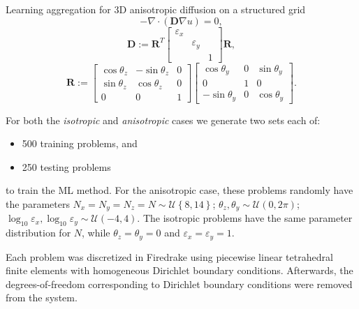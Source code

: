 \documentclass{article}
\newcommand{\mat}[1]{\bm{{#1}}}
\newcommand{\grad}{\nabla}
\begin{document}

Learning aggregation for 3D anisotropic diffusion on a structured grid
\begin{equation}
  -\grad \cdot \left(\mat{D} \grad u\right) = 0,
\end{equation}
\begin{equation}
  \mat{D} := \mat{R}^T\begin{bmatrix}\varepsilon_x & & \\ & \varepsilon_y & \\ & & 1 \end{bmatrix}\mat{R},
\end{equation}
\begin{equation}
  \mat{R} := \begin{bmatrix} \cos \theta_z & -\sin \theta_z & 0 \\ \sin \theta_z & \cos \theta_z & 0 \\ 0 & 0 & 1\end{bmatrix} \begin{bmatrix}\cos \theta_y & 0 & \sin \theta_y \\ 0 & 1 & 0 \\ -\sin\theta_y & 0 & \cos\theta_y \end{bmatrix}.
\end{equation}

For both the \textit{isotropic} and \textit{anisotropic} cases we generate two sets each of:
\begin{itemize}
\item 500 training problems, and
\item 250 testing problems
\end{itemize}
to train the ML method.  For the anisotropic case, these problems randomly have the parameters $N_x=N_y=N_z=N \sim \mathcal{U}\left\{8, 14\right\}$; $\theta_z, \theta_y \sim \mathcal{U}\left(0, 2\pi\right)$; $\log_{10}\varepsilon_x, \log_{10}\varepsilon_y \sim \mathcal{U}\left(-4, 4\right)$.  The isotropic problems have the same parameter distribution for $N$, while $\theta_z=\theta_y=0$ and $\varepsilon_x=\varepsilon_y=1$.

Each problem was discretized in Firedrake \cite{Firedrake} using piecewise linear tetrahedral finite elements with homogeneous Dirichlet boundary conditions.  Afterwards, the degrees-of-freedom corresponding to Dirichlet boundary conditions were removed from the system.
\end{document}
